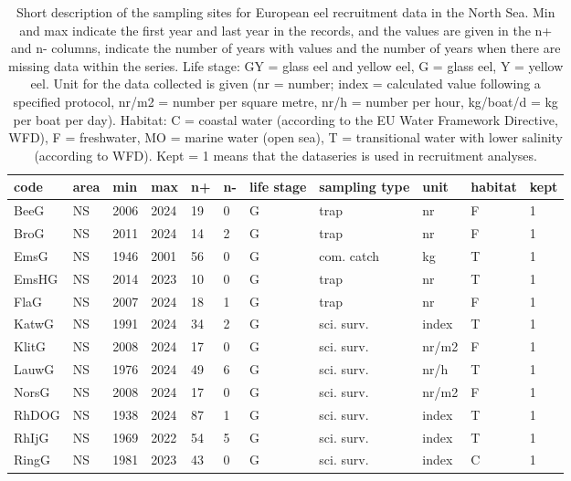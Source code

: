 \begin{table}[ht]
\centering
\caption{Short description of the sampling sites for European eel recruitment data in the North Sea. Min and max indicate the first year and last year in the records, and the values are given in the n+ and n- columns, indicate the number of years with values and the number of years when there are missing data within the series. Life stage: GY = glass eel and yellow eel, G = glass eel, Y = yellow eel. Unit for the data collected is given (nr = number; index = calculated value following a specified protocol, nr/m2 = number per square metre, nr/h = number per hour, kg/boat/d = kg per boat per day). Habitat: C = coastal water (according to the EU Water Framework Directive, WFD), F = freshwater, MO = marine water (open sea), T = transitional water with lower salinity (according to WFD). Kept = 1 means that the dataseries is used in recruitment analyses.} 
\label{statseriesG}
\begin{tabular}{p{1cm}p{1cm}p{1cm}p{1cm}p{0.8cm}p{0.8cm}p{1cm}p{2cm}p{2cm}p{1cm}p{1cm}}
  \hline
code & area & min & max & n+ & n- & life stage & sampling type & unit & habitat & kept \\ 
  \hline
BeeG & NS & 2006 & 2024 & 19 & 0 & G & trap & nr & F & 1 \\ 
  BroG & NS & 2011 & 2024 & 14 & 2 & G & trap & nr & F & 1 \\ 
  EmsG & NS & 1946 & 2001 & 56 & 0 & G & com. catch & kg & T & 1 \\ 
  EmsHG & NS & 2014 & 2023 & 10 & 0 & G & trap & nr & T & 1 \\ 
  FlaG & NS & 2007 & 2024 & 18 & 1 & G & trap & nr & F & 1 \\ 
  KatwG & NS & 1991 & 2024 & 34 & 2 & G & sci. surv. & index & T & 1 \\ 
  KlitG & NS & 2008 & 2024 & 17 & 0 & G & sci. surv. & nr/m2 & F & 1 \\ 
  LauwG & NS & 1976 & 2024 & 49 & 6 & G & sci. surv. & nr/h & T & 1 \\ 
  NorsG & NS & 2008 & 2024 & 17 & 0 & G & sci. surv. & nr/m2 & F & 1 \\ 
  RhDOG & NS & 1938 & 2024 & 87 & 1 & G & sci. surv. & index & T & 1 \\ 
  RhIjG & NS & 1969 & 2022 & 54 & 5 & G & sci. surv. & index & T & 1 \\ 
  RingG & NS & 1981 & 2023 & 43 & 0 & G & sci. surv. & index & C & 1 \\ 

\end{tabular}
\end{table}
